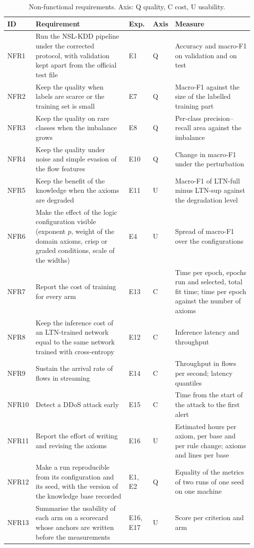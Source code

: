 \begin{table}[tbp]
\centering
\footnotesize
\caption{Non-functional requirements. Axis: Q quality, C cost, U usability.}
\label{tab:nonfunctional-requirements}
\setlength{\tabcolsep}{4pt}
\begin{tabular}{@{}p{1.1cm}p{5.4cm}p{1.2cm}p{0.7cm}p{4.2cm}@{}}
\toprule
ID & Requirement & Exp. & Axis & Measure \\
\midrule
NFR1 & Run the NSL-KDD pipeline under the corrected protocol, with validation kept apart from the official test file
  & E1 & Q & Accuracy and macro-F1 on validation and on test \\
NFR2 & Keep the quality when labels are scarce or the training set is small
  & E7 & Q & Macro-F1 against the size of the labelled training part \\
NFR3 & Keep the quality on rare classes when the imbalance grows
  & E8 & Q & Per-class precision--recall area against the imbalance \\
NFR4 & Keep the quality under noise and simple evasion of the flow features
  & E10 & Q & Change in macro-F1 under the perturbation \\
NFR5 & Keep the benefit of the knowledge when the axioms are degraded
  & E11 & U & Macro-F1 of LTN-full minus LTN-sup against the degradation level \\
NFR6 & Make the effect of the logic configuration visible (exponent $p$, weight of the domain axioms, crisp or graded conditions, scale of the widths)
  & E4 & U & Spread of macro-F1 over the configurations \\
NFR7 & Report the cost of training for every arm
  & E13 & C & Time per epoch, epochs run and selected, total fit time; time per epoch against the number of axioms \\
NFR8 & Keep the inference cost of an LTN-trained network equal to the same network trained with cross-entropy
  & E12 & C & Inference latency and throughput \\
NFR9 & Sustain the arrival rate of flows in streaming
  & E14 & C & Throughput in flows per second; latency quantiles \\
NFR10 & Detect a DDoS attack early
  & E15 & C & Time from the start of the attack to the first alert \\
NFR11 & Report the effort of writing and revising the axioms
  & E16 & U & Estimated hours per axiom, per base and per rule change; axioms and lines per base \\
NFR12 & Make a run reproducible from its configuration and its seed, with the version of the knowledge base recorded
  & E1, E2 & Q & Equality of the metrics of two runs of one seed on one machine \\
NFR13 & Summarise the usability of each arm on a scorecard whose anchors are written before the measurements
  & E16, E17 & U & Score per criterion and arm \\
\bottomrule
\end{tabular}
\end{table}

